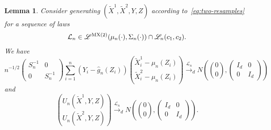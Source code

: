 \documentclass[ejs]{imsart}
\numberwithin{equation}{section}
\theoremstyle{plain}
\newtheorem{lemma}{Lemma}
\theoremstyle{definition}
\theoremstyle{remark}
\newcommand{\srz}{Z}
\newcommand{\srxk}{\widetilde X}
\newcommand{\sry}{Y}
\begin{document}
\begin{lemma}\label{lem:clt}
	Consider generating $(\srxk^1, \srxk^2, \sry, \srz)$ according to~\eqref{eq:two-resamples} for a sequence of laws
	\begin{equation}
		\mathcal L_n \in \mathscr L^{\textnormal{MX(2)}}(\mu_n(\cdot), \Sigma_n(\cdot)) \cap \mathscr L_n(c_1, c_2).
	\end{equation}
	We have 
	\begin{equation}
		n^{-1/2}
		\begin{pmatrix}
			S_n^{-1} & 0 \\
			0 & S_n^{-1}
		\end{pmatrix}\sum_{i = 1}^n (\sry_{i} - \widehat g_n(\srz_{i})){\srxk^1_{i} - \mu_n(\srz_i) \choose \srxk^2_{i} - \mu_n(\srz_i)} \overset{\mathcal L_n}\rightarrow_d N\left({0 \choose 0}, \begin{pmatrix}
			I_d & 0 \\
			0 & I_d
		\end{pmatrix}
		\right)
		\label{convergence-1}
	\end{equation}
	and
	\begin{equation}
		{U_n(\srxk^1, \sry, \srz) \choose U_n(\srxk^2, \sry, \srz)} \overset{\mathcal L_n}\rightarrow_d N\left({0 \choose 0},
		\begin{pmatrix}
			I_d & 0 \\
			0 & I_d
		\end{pmatrix}
		\right).
		\label{convergence-2}
	\end{equation}
\end{lemma}
\end{document}
